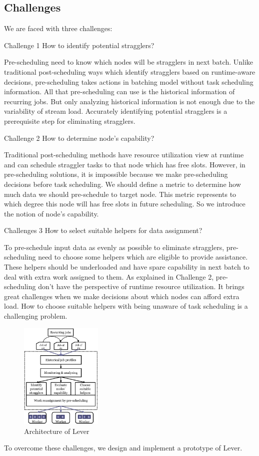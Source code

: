 \subsection{Challenges}

  We are faced with three challenges:

  Challenge 1 How to identify potential stragglers?

  Pre-scheduling need to know which nodes will be stragglers in next batch. Unlike traditional post-scheduling ways which identify stragglers based on runtime-aware decisions, pre-scheduling takes actions in batching model without task scheduling information. All that pre-scheduling can use is the historical information of recurring jobs. But only analyzing historical information is not enough due to the variability of stream load. Accurately identifying potential stragglers is a prerequisite step for eliminating stragglers.

  Challenge 2 How to determine node's capability?

  Traditional post-scheduling methods have resource utilization view at runtime and can schedule straggler tasks to that node which has free slots. However, in pre-scheduling solutions, it is impossible because we make pre-scheduling decisions before task scheduling. We should define a metric to determine how much data we should pre-schedule to target node. This metric represents to which degree this node will has free slots in future scheduling. So we introduce the notion of node's capability.

  Challenges 3 How to select suitable helpers for data assignment?

  To pre-schedule input data as evenly as possible to eliminate stragglers, pre-scheduling need to choose some helpers which are eligible to provide assistance. These helpers should be underloaded and have spare capability in next batch to deal with extra work assigned to them. As explained in Challenge 2, pre-scheduling don't have the perspective of runtime resource utilization. It brings great challenges when we make decisions about which nodes can afford extra load. How to choose suitable helpers with being unaware of task scheduling is a challenging problem.

  \begin{figure}[htbp]
    \centering
    \includegraphics[width=0.35\textwidth]{FigureArchitecture}
    \caption{Architecture of Lever}
    \label{Fig. 4:}
  \end{figure}
  To overcome these challenges, we design and implement a prototype of Lever.